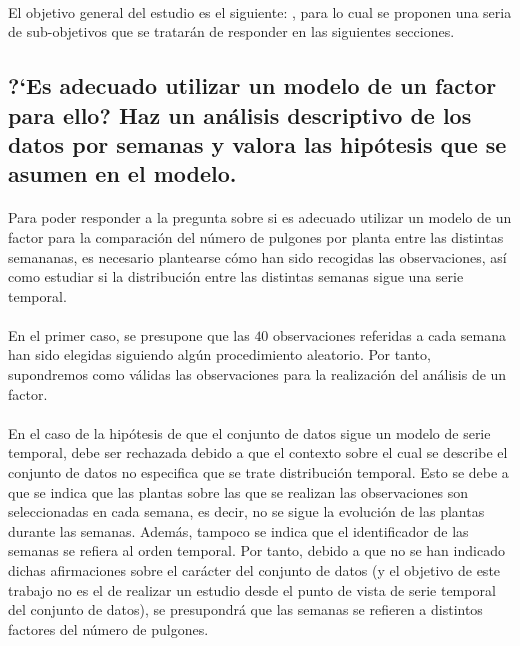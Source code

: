 \documentclass[11pt]{article}
\begin{document}
    \paragraph{}
    El objetivo general del estudio es el siguiente: \textbf{}, para lo cual se proponen una seria de sub-objetivos que se tratarán de responder en las siguientes secciones.

    \subsection{?`Es adecuado utilizar un modelo de un factor para ello? Haz un análisis descriptivo de los datos por semanas y valora las hipótesis que se asumen en el modelo.}
    \label{sec:e1}

      \paragraph{}
      Para poder responder a la pregunta sobre si es adecuado utilizar un modelo de un factor para la comparación del número de pulgones por planta entre las distintas semananas, es necesario plantearse cómo han sido recogidas las observaciones, así como estudiar si la distribución entre las distintas semanas sigue una serie temporal.

      \paragraph{}
      En el primer caso, se presupone que las $40$ observaciones referidas a cada semana han sido elegidas siguiendo algún procedimiento aleatorio. Por tanto, supondremos como válidas las observaciones para la realización del análisis de un factor.

      \paragraph{}
      En el caso de la hipótesis de que el conjunto de datos sigue un modelo de serie temporal, debe ser rechazada debido a que el contexto sobre el cual se describe el conjunto de datos no especifica que se trate distribución temporal. Esto se debe a que se indica que las plantas sobre las que se realizan las observaciones son seleccionadas en cada semana, es decir, no se sigue la evolución de las plantas durante las semanas. Además, tampoco se indica que el identificador de las semanas se refiera al orden temporal. Por tanto, debido a que no se han indicado dichas afirmaciones sobre el carácter del conjunto de datos (y el objetivo de este trabajo no es el de realizar un estudio desde el punto de vista de serie temporal del conjunto de datos), se presupondrá que las semanas se refieren a distintos factores del número de pulgones.
\end{document}
